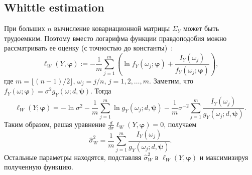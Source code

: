 \documentclass[specialist,
substylefile = spbu_report.rtx,
subf,href,colorlinks=true, 12pt]{disser}
\theoremstyle{definition}
\begin{document}
\subsection{Whittle estimation}
При больших $n$ вычисление ковариационной матрицы $\Sigma_Y$ может быть трудоемким. Поэтому вместо логарифма функции правдоподобия можно рассматривать ее оценку (с точностью до константы)~\cite{Whittle1953}:
\[
	\ell_W(Y, \boldsymbol{\varphi}):=-\frac1m\sum_{j=1}^m\left(\ln f_Y(\omega_j; \boldsymbol{\varphi}) + \frac{I_Y(\omega_j)}{f_Y(\omega_j; \boldsymbol{\varphi})}\right),
\]
где $m=\lfloor(n-1)/2\rfloor$, $\omega_j = j / n$, $j=1,2,\ldots,m$. Заметим, что $f_Y(\omega; \boldsymbol{\varphi})=\sigma^2 g_Y(\omega; d, \boldsymbol{\psi})$. Тогда
\[
	\ell_W(Y; \boldsymbol{\varphi})=-\ln\sigma^2 - \frac1m \sum_{j=1}^m\ln g_Y(\omega_j; d, \boldsymbol{\psi}) - \frac1m\sigma^{-2} \sum_{j=1}^m\frac{I_Y(\omega_j)}{g_Y(\omega_j; d, \boldsymbol{\psi})}.
\]
Таким образом, решая уравнение $\frac{d}{d \sigma}\ell_W(Y, \boldsymbol{\varphi})=0$, получаем
\[
	\widehat\sigma_W^2=\frac1m \sum_{j=1}^m\frac{I_Y(\omega_j)}{g_Y(\omega_j; d, \boldsymbol{\psi})}.
\]
Остальные параметры находятся, подставляя $\widehat\sigma^2_W$ в $\ell_W(Y, \boldsymbol{\varphi})$ и максимизируя полученную функцию.



\end{document}
